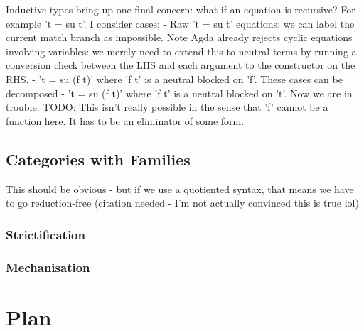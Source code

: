 \documentclass[
    a4paper, %
    fontsize=11pt, %
    twoside=false, %
	numbers=noenddot, %
	fontmethod=tex, %
]{kaobook}
\begin{document}
Inductive types bring up one final concern: what if an equation is recursive?
For example 't = su t'. I consider cases:
- Raw 't = su t' equations: we can label the current match branch as impossible.
  Note Agda already rejects cyclic equations involving variables: we merely
  need to extend this to neutral terms by running a conversion check between the
  LHS and each argument to the constructor on the RHS.
- 't = su (f t)' where 'f t' is a neutral blocked on 'f'. These cases can
  be decomposed
- 't = su (f t)' where 'f t' is a neutral blocked on 't'. Now we are in trouble.
  TODO: This isn't really possible in the sense that 'f' cannot be a function
  here. It has to be an eliminator of some form.

\section{Categories with Families}




This should be obvious - but if we use a quotiented syntax, that means we have
to go reduction-free (citation needed - I'm not actually convinced this is true
lol)


\subsection{Strictification}

\subsection{Mechanisation}
\chapter{Plan}


% 
\printbibliography[heading=bibintoc, title=Bibliography]
\end{document}

